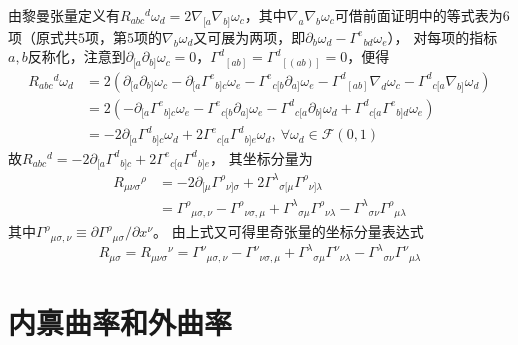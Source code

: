 由黎曼张量定义有$R_{abc}{}^d\omega_d = 2\nabla_{[a}\nabla_{b]}\omega_c$，其中$\nabla_a\nabla_b\omega_c$可借前面证明中的等式表为$6$项（原式共$5$项，第$5$项的$\nabla_b\omega_d$又可展为两项，即$\partial_b\omega_d - \Gamma^e{}_{bd}\omega_e$），
对每项的指标$a, b$反称化，注意到$\partial_{[a}\partial_{b]}\omega_c = 0$，$\Gamma^d{}_{[ab]} = \Gamma^d{}_{[(ab)]} = 0$，便得
$$\begin{aligned}
R_{abc}{}^d\omega_d & = 2(\partial_{[a}\partial_{b]}\omega_c - \partial_{[a}\Gamma^e{}_{b]c}\omega_e - \Gamma^e{}_{c[b}\partial_{a]}\omega_e - \Gamma^d{}_{[ab]}\nabla_d\omega_c - \Gamma^d{}_{c[a}\nabla_{b]}\omega_d) \\
& = 2(-\partial_{[a}\Gamma^e{}_{b]c}\omega_e - \Gamma^e{}_{c[b}\partial_{a]}\omega_e - \Gamma^d{}_{c[a}\partial_{b]}\omega_d + \Gamma^d{}_{c[a}\Gamma^e{}_{b]d}\omega_e) \\
& = -2\partial_{[a}\Gamma^d{}_{b]c}\omega_d + 2\Gamma^e{}_{c[a}\Gamma^d{}_{b]e}\omega_d, ~ \forall \omega_d \in \mathscr{F}(0, 1)
\end{aligned}$$
故$R_{abc}{}^d = -2\partial_{[a}\Gamma^d{}_{b]c} + 2\Gamma^e{}_{c[a}\Gamma^d{}_{b]e}$，
其坐标分量为
$$\begin{aligned}
R_{\mu\nu\sigma}{}^\rho & = -2\partial_{[\mu}\Gamma^\rho{}_{\nu]\sigma} + 2\Gamma^\lambda{}_{\sigma[\mu}\Gamma^\rho{}_{\nu]\lambda}\\
& = \Gamma^\rho{}_{\mu\sigma, \nu} - \Gamma^\rho{}_{\nu\sigma, \mu} + \Gamma^\lambda{}_{\sigma\mu}\Gamma^\rho{}_{\nu\lambda} - \Gamma^\lambda{}_{\sigma\nu}\Gamma^\rho{}_{\mu\lambda}
\end{aligned}$$
其中$\Gamma^\rho{}_{\mu\sigma, \nu} \equiv \partial\Gamma^\rho{}_{\mu\sigma} / \partial x^\nu$。
由上式又可得里奇张量的坐标分量表达式
$$R_{\mu\sigma} = R_{\mu\nu\sigma}{}^\nu = \Gamma^\nu{}_{\mu\sigma, \nu} - \Gamma^\nu{}_{\nu\sigma, \mu} + \Gamma^\lambda{}_{\sigma\mu}\Gamma^\nu{}_{\nu\lambda} - \Gamma^\lambda{}_{\sigma\nu}\Gamma^\nu{}_{\mu\lambda}$$

\section{内禀曲率和外曲率}

